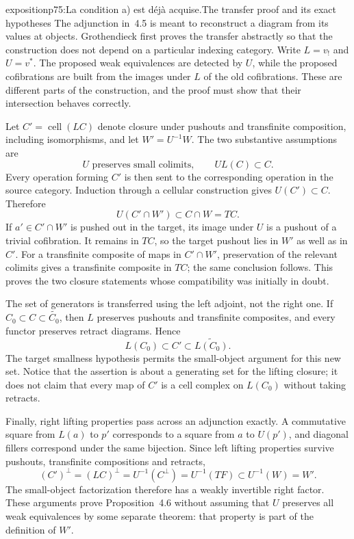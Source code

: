 \begin{dcomment}{exposition}{p75:La condition a) est déjà acquise.}{The transfer proof and its exact hypotheses}
The adjunction in~4.5 is meant to reconstruct a diagram from its values at objects. Grothendieck first proves the transfer abstractly so that the construction does not depend on a particular indexing category. Write $L=v_!$ and $U=v^*$. The proposed weak equivalences are detected by $U$, while the proposed cofibrations are built from the images under $L$ of the old cofibrations. These are different parts of the construction, and the proof must show that their intersection behaves correctly.

Let $C'=\operatorname{cell}(LC)$ denote closure under pushouts and transfinite composition, including isomorphisms, and let $W'=U^{-1}W$. The two substantive assumptions are
\[
 U\text{ preserves small colimits},\qquad UL(C)\subset C.
\]
Every operation forming $C'$ is then sent to the corresponding operation in the source category. Induction through a cellular construction gives $U(C')\subset C$. Therefore
\[
 U(C'\cap W')\subset C\cap W=TC.
\]
If $a'\in C'\cap W'$ is pushed out in the target, its image under $U$ is a pushout of a trivial cofibration. It remains in $TC$, so the target pushout lies in $W'$ as well as in $C'$. For a transfinite composite of maps in $C'\cap W'$, preservation of the relevant colimits gives a transfinite composite in $TC$; the same conclusion follows. This proves the two closure statements whose compatibility was initially in doubt.

The set of generators is transferred using the left adjoint, not the right one. If $C_0\subset C\subset\widetilde{C_0}$, then $L$ preserves pushouts and transfinite composites, and every functor preserves retract diagrams. Hence
\[
 L(C_0)\subset C'\subset\widetilde{L(C_0)}.
\]
The target smallness hypothesis permits the small-object argument for this new set. Notice that the assertion is about a generating set for the lifting closure; it does not claim that every map of $C'$ is a cell complex on $L(C_0)$ without taking retracts.

Finally, right lifting properties pass across an adjunction exactly. A commutative square from $L(a)$ to $p'$ corresponds to a square from $a$ to $U(p')$, and diagonal fillers correspond under the same bijection. Since left lifting properties survive pushouts, transfinite compositions and retracts,
\[
 (C')^{\perp}=(LC)^{\perp}
 =U^{-1}(C^{\perp})=U^{-1}(TF)\subset U^{-1}(W)=W'.
\]
The small-object factorization therefore has a weakly invertible right factor. These arguments prove Proposition~4.6 without assuming that $U$ preserves all weak equivalences by some separate theorem: that property is part of the definition of $W'$.


\end{dcomment}
